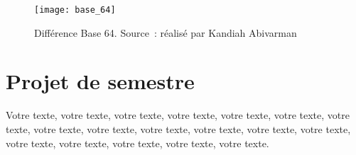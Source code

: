 \begin{figure}[tbph!]
	\centering
	\texttt{[image: base\_64]}
	\caption[Différence Base 64]{Différence Base 64. Source : réalisé par Kandiah Abivarman}
	\label{fig:base_64}
\end{figure}

\section{Projet de semestre}
Votre texte, votre texte, votre texte, votre texte, votre texte, votre texte, votre texte, votre texte, votre texte, votre texte, votre texte, votre texte, votre texte, votre texte, votre texte, votre texte, votre texte, votre texte.
